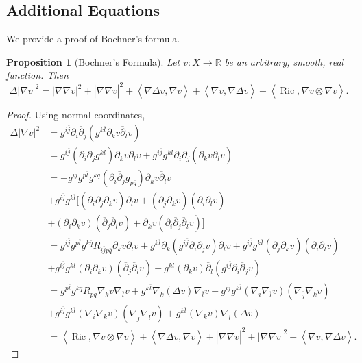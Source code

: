 \documentclass[12pt]{article}
\newtheorem{proposition}[theorem]{Proposition}
\numberwithin{equation}{section}
\newcommand{\R}{\mathbb{R}}
\renewcommand{\d}{\partial}
\newcommand{\dbar}{\overline{\partial}}
\DeclareMathOperator{\Ric}{Ric}
\newcommand{\oo}[1]{\overline{#1}}
\newcommand{\ip}[1]{\left\langle#1\right\rangle}
\begin{document}
\subsection{Additional Equations}

\noindent We provide a proof of Bochner's formula.

\begin{proposition}[Bochner's Formula]
Let $v: X \to \R$ be an arbitrary, smooth, real function. Then
\begin{equation}\label{Bochner_formula}
    \Delta |\nabla v|^2 = |\nabla \nabla v|^2 + |\nabla \oo{\nabla} v|^2 + \ip{\nabla \Delta v, \oo{\nabla} v} + \ip{\nabla v, \oo{\nabla} \Delta v} + \ip{\Ric, \oo{\nabla} v \otimes \nabla v}.
\end{equation}
\end{proposition}

{\allowdisplaybreaks
\begin{proof}
Using normal coordinates,
\begin{align*}
    \Delta |\nabla v|^2 &= g^{i\oo{j}} \d_i \dbar_j (g^{k\oo{l}} \d_k v \dbar_l v)\\
    &= g^{i\oo{j}} (\d_i \dbar_j g^{k\oo{l}}) \d_k v \dbar_l v + g^{i\oo{j}} g^{k\oo{l}}  \d_i \dbar_j (\d_k v \dbar_l v)\\
    &= -g^{i\oo{j}} g^{p\oo{l}} g^{k\oo{q}} (\d_i \dbar_j g_{p\oo{q}}) \d_k v \dbar_l v\\
    &+ g^{i\oo{j}} g^{k\oo{l}} [(\d_i \dbar_j\d_k v) \dbar_l v + (\dbar_j\d_k v) (\d_i \dbar_l v)\\
    &+ (\d_i \d_k v) (\dbar_j \dbar_l v) + \d_k v (\d_i \dbar_j\dbar_l v)]\\
    &= g^{i\oo{j}} g^{p\oo{l}} g^{k\oo{q}} R_{i\oo{j}p\oo{q}} \d_k v \dbar_l v + g^{k\oo{l}} \d_k (g^{i\oo{j}}\d_i \dbar_j v) \dbar_l v + g^{i\oo{j}} g^{k\oo{l}} (\dbar_j\d_k v) (\d_i \dbar_l v)\\
    &+ g^{i\oo{j}} g^{k\oo{l}} (\d_i \d_k v) (\dbar_j \dbar_l v) + g^{k\oo{l}} (\d_k v) \dbar_l (g^{i\oo{j}}\d_i \dbar_j v)\\
    &= g^{p\oo{l}} g^{k\oo{q}} R_{p\oo{q}} \nabla_k v \nabla_{\oo{l}} v + g^{k\oo{l}} \nabla_k (\Delta v) \nabla_{\oo{l}} v + g^{i\oo{j}} g^{k\oo{l}} (\nabla_i \nabla_{\oo{l}} v)(\nabla_{\oo{j}}\nabla_k v) \\
    &+ g^{i\oo{j}} g^{k\oo{l}} (\nabla_i \nabla_k v) (\nabla_{\oo{j}} \nabla_{\oo{l}} v) + g^{k\oo{l}} (\nabla_k v) \nabla_{\oo{l}} (\Delta v)\\ 
    &= \ip{\Ric, \oo{\nabla} v \otimes \nabla v} +\ip{\nabla \Delta v, \oo{\nabla} v} + |\nabla \oo{\nabla} v|^2
    + |\nabla \nabla v|^2 + \ip{\nabla v, \oo{\nabla} \Delta v}.
\end{align*}
\end{proof}
}
\end{document}
